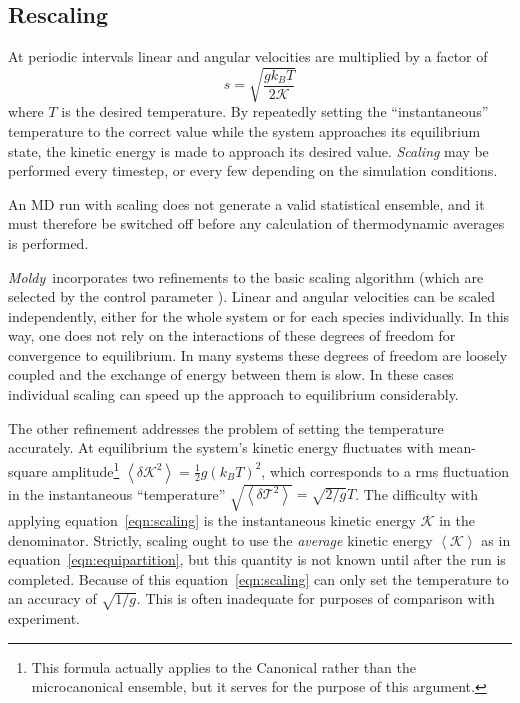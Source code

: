 \documentclass[a4paper,twoside]{report}
\newcommand{\moldy}{\emph{Moldy}}
\begin{document}
\subsection{Rescaling}
\label{sec:rescaling}

At periodic intervals linear and
angular velocities are multiplied by a factor of
\begin{equation}
\label{eqn:scaling}
s = \sqrt{\frac{gk_BT}{2\mathcal{K}}}
\end{equation}
where $T$ is the desired temperature.  By repeatedly setting the
``instantaneous'' temperature to the correct value while the system
approaches its equilibrium state, the kinetic energy is made to
approach its desired value.  \emph{Scaling} may be performed every
timestep, or every few depending on the simulation conditions.

An MD run with scaling does not generate a valid statistical ensemble,
and it must therefore be switched off before any calculation of
thermodynamic averages is performed.

\moldy\ incorporates two refinements to the basic scaling algorithm
(which are selected by the control parameter ).
Linear and angular velocities can be scaled independently, either for
the whole system or for each species individually.  In this way, one
does not rely on the interactions of these degrees of freedom for
convergence to equilibrium.  In many systems these degrees of freedom
are loosely coupled and the exchange of energy between them is slow.
In these cases individual scaling can speed up the approach to
equilibrium considerably.

The other refinement addresses the problem of setting the temperature
accurately.  At equilibrium the system's kinetic energy fluctuates
with mean-square amplitude\footnote{This formula actually applies to
the Canonical rather than the microcanonical ensemble, but it serves
for the purpose of this argument.} $\left < \delta \mathcal{K}^2\right > =
\frac{1}{2}g\left(k_BT\right)^2$, which corresponds to a
rms fluctuation in the instantaneous ``temperature'' 
$\sqrt{\left < \delta \mathcal{T}^2\right >} = 
\sqrt{2 /g} T$.   
The difficulty with applying equation~\ref{eqn:scaling}
is the instantaneous kinetic energy $\mathcal{K}$ in the denominator.
Strictly, scaling ought to use the \emph{average} kinetic energy
$\left<\mathcal{K} \right>$ as in equation~\ref{eqn:equipartition}, but
this quantity is not known until after the run is completed.  Because
of this equation~\ref{eqn:scaling} can only set the temperature to an
accuracy of $\sqrt{1/g}$.  This is often inadequate for purposes of
comparison with experiment.
\end{document}
